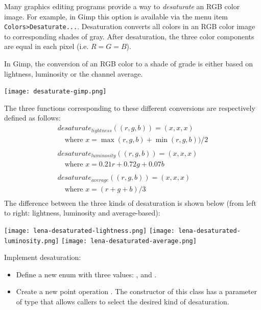 \documentclass{book}
\begin{document}
\begin{exercise}\label{ex:desaturate}
Many graphics editing programs provide a way to \emph{desaturate} an RGB color image. For example, in Gimp this option is available via the menu item \texttt{Colors>Desaturate...}. Desaturation converts all colors in an RGB color image to corresponding shades of gray. After desaturation, the three color components are equal in each pixel (i.e. $R=G=B$).

In Gimp, the conversion of an RGB color to a shade of grade is either based on lightness, luminosity or the channel average. 
\begin{center}
\texttt{[image: desaturate-gimp.png]}
\end{center}
The three functions corresponding to these different conversions are respectively defined as follows:
$$\begin{array}{l}
desaturate_{lightness}((r, g, b)) = (x, x, x)\\
\quad \text{where $x = \max(r, g, b) + \min(r, g, b)) / 2$}\\
\\
desaturate_{luminosity}((r, g, b)) = (x, x, x)\\
\quad\text{where $x = 0.21 r + 0.72 g + 0.07 b$}\\
\\
desaturate_{average}((r, g, b)) = (x, x, x)\\
\quad\text{where $x = (r + g + b)/3$}\\
\end{array}$$
The difference between the three kinds of desaturation is shown below (from left to right: lightness, luminosity and average-based):
\begin{center}
\texttt{[image: lena-desaturated-lightness.png]}
\texttt{[image: lena-desaturated-luminosity.png]}
\texttt{[image: lena-desaturated-average.png]}
\end{center}
Implement desaturation:
\begin{itemize}
  \item Define a new enum  with three values: ,  and .
  \item Create a new point operation . The constructor of this class has a parameter of type  that allows callers to select the desired kind of desaturation.
\end{itemize}
\end{exercise}
\end{document}
